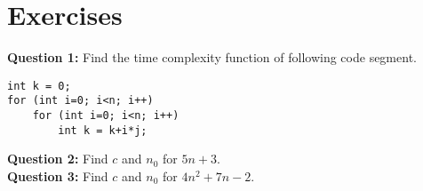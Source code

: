 \documentclass[12pt,a4paper]{article}
\begin{document}
\section{Exercises}
\noindent\textbf{Question 1:} Find the time complexity function of following code segment.
\begin{lstlisting}
int k = 0;
for (int i=0; i<n; i++)
    for (int i=0; i<n; i++)
        int k = k+i*j;
\end{lstlisting}
\noindent\textbf{Question 2:} Find $c$ and $n_0$ for $5n+3$.\\[0.2cm]
\noindent\textbf{Question 3:} Find $c$ and $n_0$ for $4n^2+7n-2$.


\end{document}
